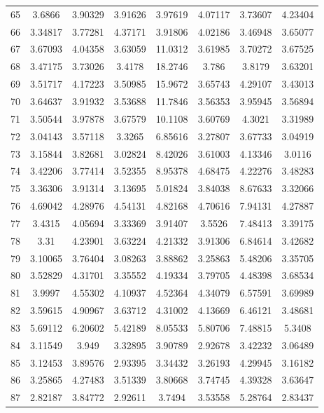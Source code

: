 \begin{center}
\begin{longtable}{cccccccc}
65 & 3.6866 & 3.90329 & 3.91626 & 3.97619 & 4.07117 & 3.73607 & 4.23404\\
66 & 3.34817 & 3.77281 & 4.37171 & 3.91806 & 4.02186 & 3.46948 & 3.65077\\
67 & 3.67093 & 4.04358 & 3.63059 & 11.0312 & 3.61985 & 3.70272 & 3.67525\\
68 & 3.47175 & 3.73026 & 3.4178 & 18.2746 & 3.786 & 3.8179 & 3.63201\\
69 & 3.51717 & 4.17223 & 3.50985 & 15.9672 & 3.65743 & 4.29107 & 3.43013\\
70 & 3.64637 & 3.91932 & 3.53688 & 11.7846 & 3.56353 & 3.95945 & 3.56894\\
71 & 3.50544 & 3.97878 & 3.67579 & 10.1108 & 3.60769 & 4.3021 & 3.31989\\
72 & 3.04143 & 3.57118 & 3.3265 & 6.85616 & 3.27807 & 3.67733 & 3.04919\\
73 & 3.15844 & 3.82681 & 3.02824 & 8.42026 & 3.61003 & 4.13346 & 3.0116\\
74 & 3.42206 & 3.77414 & 3.52355 & 8.95378 & 4.68475 & 4.22276 & 3.48283\\
75 & 3.36306 & 3.91314 & 3.13695 & 5.01824 & 3.84038 & 8.67633 & 3.32066\\
76 & 4.69042 & 4.28976 & 4.54131 & 4.82168 & 4.70616 & 7.94131 & 4.27887\\
77 & 3.4315 & 4.05694 & 3.33369 & 3.91407 & 3.5526 & 7.48413 & 3.39175\\
78 & 3.31 & 4.23901 & 3.63224 & 4.21332 & 3.91306 & 6.84614 & 3.42682\\
79 & 3.10065 & 3.76404 & 3.08263 & 3.88862 & 3.25863 & 5.48206 & 3.35705\\
80 & 3.52829 & 4.31701 & 3.35552 & 4.19334 & 3.79705 & 4.48398 & 3.68534\\
81 & 3.9997 & 4.55302 & 4.10937 & 4.52364 & 4.34079 & 6.57591 & 3.69989\\
82 & 3.59615 & 4.90967 & 3.63712 & 4.31002 & 4.13669 & 6.46121 & 3.48681\\
83 & 5.69112 & 6.20602 & 5.42189 & 8.05533 & 5.80706 & 7.48815 & 5.3408\\
84 & 3.11549 & 3.949 & 3.32895 & 3.90789 & 2.92678 & 3.42232 & 3.06489\\
85 & 3.12453 & 3.89576 & 2.93395 & 3.34432 & 3.26193 & 4.29945 & 3.16182\\
86 & 3.25865 & 4.27483 & 3.51339 & 3.80668 & 3.74745 & 4.39328 & 3.63647\\
87 & 2.82187 & 3.84772 & 2.92611 & 3.7494 & 3.53558 & 5.28764 & 2.83437\\

\end{longtable}
\end{center}
